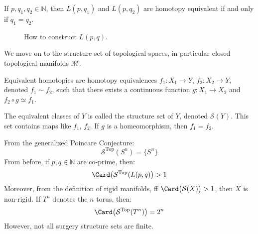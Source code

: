             \begin{theorem}
                If $p,q_{1},q_{2}\in\mathbb{N}$, then $L(p,q_{1})$ and
                $L(p,q_{2})$ are homotopy equivalent if and only if
                $q_{1}=q_{2}$.
            \end{theorem}
            \begin{figure}[H]
                \centering
                \captionsetup{type=figure}
                
                \caption{How to construct $L(p,q)$.}
                \label{fig:surgery_theory_lens_space_drawing}
            \end{figure}
            We move on to the structure set of topological spaces,
            in particular closed topological
            manifolds $\mathcal{M}$.
            \begin{definition}
                Equivalent homotopies are homotopy equivalences
                $f_{1}:X_{1}\rightarrow Y$,
                $f_{2}:X_{2}\rightarrow Y$,
                denoted $f_{1}\sim{f_{2}}$, such that there
                exists a continuous function
                $g:X_{1}\rightarrow{X_{2}}$ and
                $f_{2}\circ{g}\simeq{f_{1}}$.
            \end{definition}
            The equivalent classes of $Y$ is called the
            structure set of $Y$,
            denoted $\mathcal{S}(Y)$. This set contains maps
            like $f_{1}$, $f_{2}$.
            If $g$ is a homeomorphism, then $f_{1}=f_{2}$.
            \begin{lexample}{}{}
                From the generalized Poincare Conjecture:
                \begin{equation}
                    \mathcal{S}^{\textrm{Top}}(S^{n})
                    =\{S^{n}\}
                \end{equation}
                From before, if $p,q\in\mathbb{N}$ are co-prime, then:
                \begin{equation}
                    \Card\big(\mathcal{S}^{\textrm{Top}}(L(p,q)\big)>1
                \end{equation}
                Moreover, from the definition of rigid manifolds,
                ff $\Card\big(\mathcal{S}(X)\big)>1$, then $X$ is non-rigid.
                If $T^{n}$ denotes the $n$ torus, then:
                \begin{equation}
                    \Card\big(\mathcal{S}^{\textrm{Top}}(T^{n})\big)
                    =2^{n}
                \end{equation}
                However, not all surgery structure sets are finite.
            \end{lexample}
